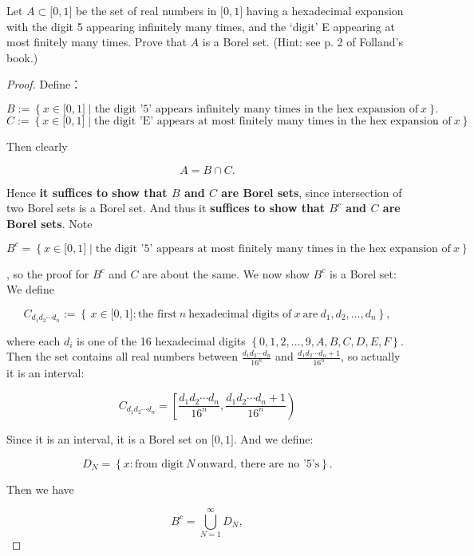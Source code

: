 \documentclass{qlnotes-export}
\begin{document}
Let \(A \subset \lbrack 0,1\rbrack\) be the set of real numbers in \(\lbrack 0,1\rbrack\) having a hexadecimal expansion with the digit 5 appearing infinitely many times, and the `digit' E appearing at most finitely many times. Prove that \(A\) is a Borel set. (Hint: see p. 2 of Folland's book.)

\begin{proof}

Define：

\[B := \left\{ {x \in \lbrack 0,1\rbrack \mid \text{the digit ’5’ appears infinitely many times in the hex expansion of}\ x} \right\}.\]\[C := \left\{ {x \in \lbrack 0,1\rbrack \mid \text{the digit ’E’ appears at most finitely many times in the hex expansion of}\ x} \right\}.\]

Then clearly

\[A = B \cap C.\]

Hence \textbf{it suffices to show that \(B\) and \(C\) are Borel sets}, since intersection of two Borel sets is a Borel set. And thus it \textbf{suffices to show that \(B^{c}\) and \(C\) are Borel sets}. Note

\[B^{c} = \left\{ {x \in \lbrack 0,1\rbrack \mid \text{the digit ’5’ appears at most finitely many times in the hex expansion of}\ x} \right\}\]

, so the proof for \(B^{c}\) and \(C\) are about the same. We now show \(B^{c}\) is a Borel set: We define

\[C_{d_{1}d_{2}\cdots d_{n}} := \left\{ {\, x \in \lbrack 0,1\rbrack:\text{the first}\ n\ \text{hexadecimal digits of}\ x\ \text{are}\ d_{1},d_{2},\ldots,d_{n}} \right\},\]

where each \(d_{i}\) is one of the 16 hexadecimal digits \(\left\{ {0,1,2,\ldots,9,A,B,C,D,E,F} \right\}\). Then the set contains all real numbers between \(\frac{d_{1}d_{2}\cdots d_{n}}{16^{n}}\) and \(\frac{d_{1}d_{2}\cdots d_{n} + 1}{16^{n}}\), so actually it is an interval:

\[C_{d_{1}d_{2}\cdots d_{n}} = \left\lbrack {\frac{d_{1}d_{2}\cdots d_{n}}{16^{n}},\frac{d_{1}d_{2}\cdots d_{n} + 1}{16^{n}}} \right)\]

Since it is an interval, it is a Borel set on \(\lbrack 0,1\rbrack\). And we define:

\[D_{N} = \left\{ {x:\text{from digit}\ N\ \text{onward, there are no ’5’s}} \right\}.\]

Then we have

\[B^{c} = \bigcup\limits_{N = 1}^{\infty}D_{N},\]


\end{proof}
\end{document}
